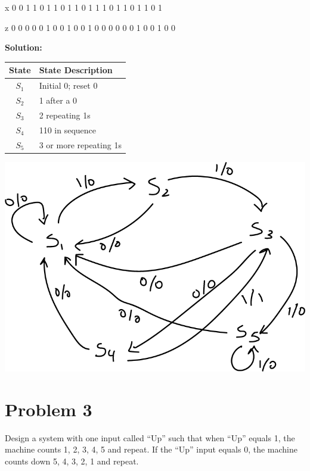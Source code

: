 \documentclass{article}
\begin{document}
    \begin{center}
        x 0 0 1 1 0 1 1 0 1 1 0 1 1 1 0 1 1 0 1 1 0 1

        z 0 0 0 0 0 1 0 0 1 0 0 1 0 0 0 0 0 0 1 0 0 1 0 0
    \end{center}

    \textbf{Solution:}

    \begin{center}
        \begin{tabular} {c|l}
            State & State Description \\
            \hline
            $S_1$ & Initial 0; reset 0 \\
            $S_2$ & 1 after a 0 \\
            $S_3$ & 2 repeating 1s \\
            $S_4$ & 110 in sequence \\
            $S_5$ & 3 or more repeating 1s
        \end{tabular}
    \end{center}

    \begin{center}
        \includegraphics[scale=0.3]{Q2_state_diagram.png}
    \end{center}


    \section*{Problem 3}

    Design a system with one input called “Up” such that when “Up” equals 1, the machine 
    counts 1, 2, 3, 4, 5 and repeat. If the “Up” input equals 0, the machine counts down 
    5, 4, 3, 2, 1 and repeat.
\end{document}
